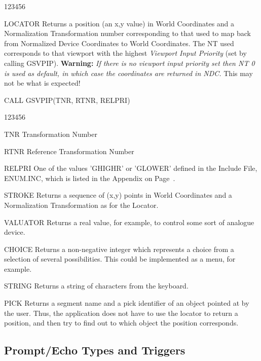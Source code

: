 \begin{DLtt}{123456}
\item[LOCATOR]
Returns a position (an x,y value) in World Coordinates
and a Normalization Transformation number corresponding to that
used to map back from Normalized Device Coordinates to World Coordinates.
The NT used corresponds to that viewport with the highest
{\it Viewport Input Priority} (set by calling GSVPIP).
{\bf Warning:} {\it If there is no viewport input priority set then
NT 0 is used as default, in which case the coordinates are
returned in NDC.} This may not be what is expected!
\begin{XMP}
CALL GSVPIP(TNR, RTNR, RELPRI)
\end{XMP}
\begin{DLtt}{123456}
\item[TNR]Transformation Number
\item[RTNR]Reference Transformation Number
\item[RELPRI]
One of the values 'GHIGHR' or 'GLOWER' defined in the Include File,
ENUM.INC, which is listed in the Appendix on Page~\pageref{sec:hdenum}.
\end{DLtt}
\item[STROKE]
Returns a sequence of (x,y) points in World Coordinates
and a Normalization Transformation as for the Locator.
\item[VALUATOR]
Returns a real value, for example, to control some sort
of analogue device.
\item[CHOICE]
Returns a non-negative integer which represents a choice from a
selection of several possibilities. This could be implemented as a
menu, for example.
\item[STRING]
Returns a string of characters from the keyboard.
\item[PICK]
Returns a segment name and a pick identifier of an object pointed
at by the user. Thus, the application does not have
to use the locator to return a position, and then try to find out
to which object the position corresponds.
\end{DLtt}
\subsection{Prompt/Echo Types and Triggers}
 

